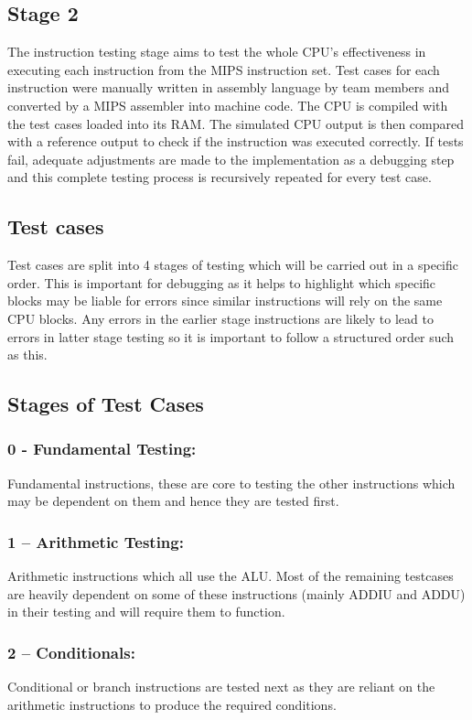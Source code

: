 \documentclass{article}
\begin{document}
\subsection{Stage 2}

The instruction testing stage aims to test the whole CPU’s effectiveness in executing each instruction from the MIPS instruction set. Test cases for each instruction were manually written in assembly language by team members and converted by a MIPS assembler into machine code. The CPU is compiled with the test cases loaded into its RAM. The simulated CPU output is then compared with a reference output to check if the instruction was executed correctly. If tests fail, adequate adjustments are made to the implementation as a debugging step and this complete testing process is recursively repeated for every test case. 

\subsection{Test cases}
Test cases are split into 4 stages of testing which will be carried out in a specific order. This is important for debugging as it helps to highlight which specific blocks may be liable for errors since similar instructions will rely on the same CPU blocks. Any errors in the earlier stage instructions are likely to lead to errors in latter stage testing so it is important to follow a structured order such as this. 

\subsection{Stages of Test Cases}

\subsubsection{0 - Fundamental Testing:}
Fundamental instructions, these are core to testing the other instructions which may be dependent on them and hence they are tested first.

\subsubsection{1 – Arithmetic Testing:}
Arithmetic instructions which all use the ALU. Most of the remaining testcases are heavily dependent on some of these instructions (mainly ADDIU and ADDU) in their testing and will require them to function.

\subsubsection{2 – Conditionals:}
Conditional or branch instructions are tested next as they are reliant on the arithmetic instructions to produce the required conditions.
\end{document}
